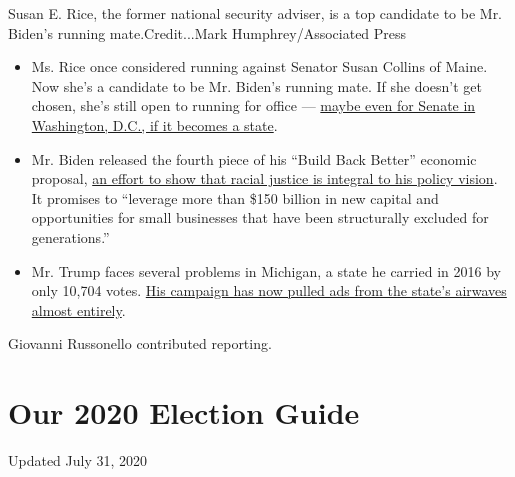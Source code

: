 Susan E. Rice, the former national security adviser, is a top candidate
to be Mr. Biden's running mate.Credit...Mark Humphrey/Associated Press

\begin{itemize}
\item
  Ms. Rice once considered running against Senator Susan Collins of
  Maine. Now she's a candidate to be Mr. Biden's running mate. If she
  doesn't get chosen, she's still open to running for office ---
  \href{https://www.nytimes.com/2020/07/27/us/politics/susan-rice-biden-vice-president.html}{maybe
  even for Senate in Washington, D.C., if it becomes a state}.
\item
  Mr. Biden released the fourth piece of his ``Build Back Better''
  economic proposal,
  \href{https://www.nytimes.com/2020/07/28/us/politics/joe-biden-racial-justice-economy-plan.html}{an
  effort to show that racial justice is integral to his policy vision}.
  It promises to ``leverage more than \$150 billion in new capital and
  opportunities for small businesses that have been structurally
  excluded for generations.''
\item
  Mr. Trump faces several problems in Michigan, a state he carried in
  2016 by only 10,704 votes.
  \href{http://nytimes.com/2020/07/29/us/politics/michigan-trump-biden-2020.html}{His
  campaign has now pulled ads from the state's airwaves almost
  entirely}.
\end{itemize}

Giovanni Russonello contributed reporting.

\hypertarget{our-2020-election-guide}{%
\section{Our 2020 Election Guide}\label{our-2020-election-guide}}

Updated July 31, 2020

